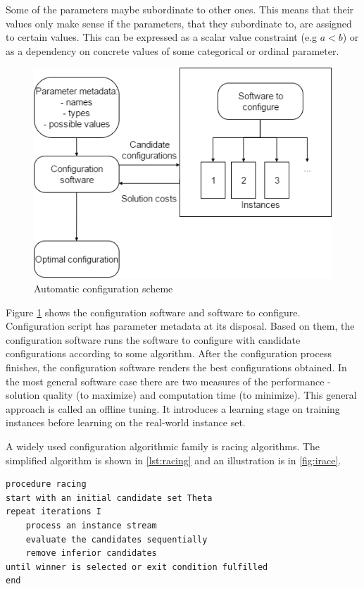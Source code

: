 \documentclass[12pt]{article}
\begin{document}
Some of the parameters maybe subordinate to other ones. This means that their values only make sense if the parameters, that they subordinate to, are assigned to certain values. This can be expressed as a scalar value constraint (e.g $a < b$) or as a dependency on concrete values of some categorical or ordinal parameter.

\begin{figure}[H]
  \centering
    \includegraphics[scale=0.7]{configuration-top-level.png}
  \caption{Automatic configuration scheme}
  \label{fig:autoconf}
\end{figure}

Figure \ref{fig:autoconf} shows the configuration software and software to configure. Configuration script has parameter metadata at its disposal. Based on them, the configuration software runs the software to configure with candidate configurations according to some algorithm. After the configuration process finishes, the configuration software renders the best configurations obtained. In the most general software case there are two measures of the performance - solution quality (to maximize) and computation time (to minimize). This general approach is called an offline tuning. It introduces a learning stage on training instances before learning on the real-world instance set.


A widely used configuration algorithmic family is racing algorithms. The simplified algorithm is shown in \ref{lst:racing} and an illustration is in \ref{fig:irace}.


\begin{minipage}[c, breaklines=true]{0.95\textwidth}
\begin{lstlisting}[caption={General racing pseudo-code}, label={lst:racing}]
procedure racing
start with an initial candidate set Theta
repeat iterations I
	process an instance stream
	evaluate the candidates sequentially
	remove inferior candidates
until winner is selected or exit condition fulfilled
end
\end{lstlisting}
\end{minipage}
\end{document}
